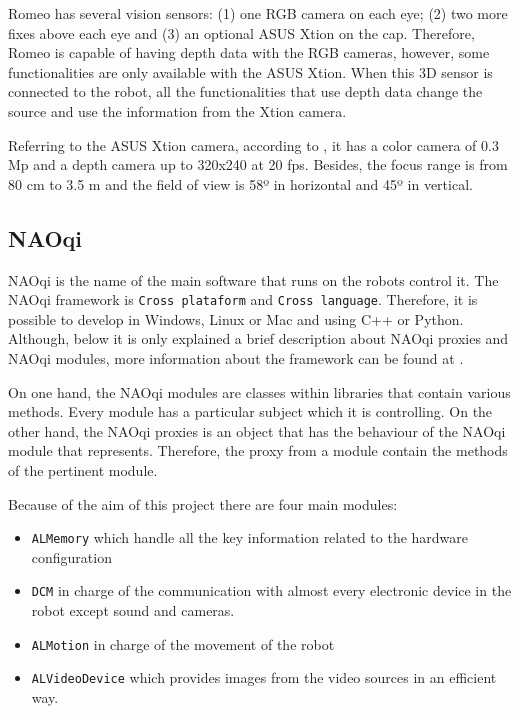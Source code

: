 \documentclass[12pt,a4paper,final,twoside,openright]{report}
\begin{document}
Romeo has several vision sensors: (1) one RGB camera on each eye; (2) two more fixes above each eye and (3) an optional ASUS Xtion on the cap. Therefore, Romeo is capable of having depth data with the RGB cameras, however, some functionalities are only available with the ASUS Xtion. When this 3D sensor is connected to the robot, all the functionalities that use depth data change the source and use the information from the Xtion camera. 

Referring to the ASUS Xtion camera, according to \cite{Aldebaran}, it has a color camera of 0.3 Mp and a depth camera up to 320x240 at 20 fps. Besides, the focus range is from 80 cm to 3.5 m and the field of view is 58º in horizontal and 45º in vertical.

\subsection{NAOqi}
\label{sec:naoqi}

NAOqi is the name of the main software that runs on the robots control it. The NAOqi framework is \texttt{Cross plataform} and \texttt{Cross language}. Therefore, it is possible to develop in Windows, Linux or Mac and using C++ or Python. Although, below it is only explained a brief description about NAOqi proxies and NAOqi modules, more information about the framework can be found at \citep{Aldebaran}. 

On one hand, the NAOqi modules are classes within libraries that contain various methods. Every module has a particular subject which it is controlling. On the other hand, the NAOqi proxies is an object that has the behaviour of the NAOqi module that represents. Therefore, the proxy from a module contain the methods of the pertinent module.

Because of the aim of this project there are four main modules:

\begin{itemize}
\item \texttt{ALMemory} which handle all the key information related to the hardware configuration
\item \texttt{DCM} in charge of the communication with almost every electronic device in the robot except sound and cameras.
\item \texttt{ALMotion} in charge of the movement of the robot
\item \texttt{ALVideoDevice} which provides images from the video sources in an efficient way.
\end{itemize} 
\end{document}
